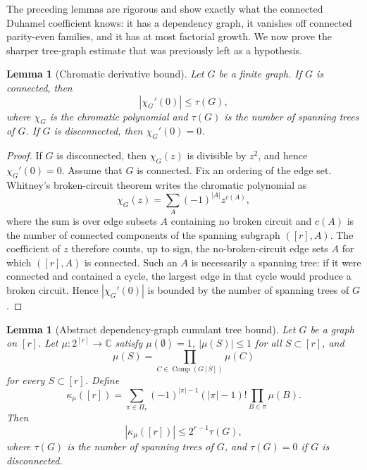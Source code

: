\documentclass[11pt]{article}
\newtheorem{lemma}[theorem]{Lemma}
\newcommand{\C}{\mathbb{C}}
\newcommand{\Comp}{\operatorname{Comp}}
\begin{document}
The preceding lemmas are rigorous and show exactly what the connected Duhamel
coefficient knows: it has a dependency graph, it vanishes off connected
parity-even families, and it has at most factorial growth.  We now prove the
sharper tree-graph estimate that was previously left as a hypothesis.

\begin{lemma}[Chromatic derivative bound]
  \label{lem:chromatic-derivative-bound}
  Let $G$ be a finite graph.  If $G$ is connected, then
  \begin{equation}\label{eq:chromatic-derivative-bound}
    |\chi_G'(0)|
    \leq
    \tau(G),
  \end{equation}
  where $\chi_G$ is the chromatic polynomial and $\tau(G)$ is the number of
  spanning trees of $G$.  If $G$ is disconnected, then $\chi_G'(0)=0$.
\end{lemma}

\begin{proof}
  If $G$ is disconnected, then $\chi_G(z)$ is divisible by $z^2$, and hence
  $\chi_G'(0)=0$.  Assume that $G$ is connected.  Fix an ordering of the edge
  set.  Whitney's broken-circuit theorem writes the chromatic polynomial as
  \begin{equation}\label{eq:whitney-broken-circuit}
    \chi_G(z)
    =
    \sum_{A}(-1)^{|A|}z^{c(A)},
  \end{equation}
  where the sum is over edge subsets $A$ containing no broken circuit and
  $c(A)$ is the number of connected components of the spanning subgraph
  $([r],A)$.  The coefficient of $z$ therefore counts, up to sign, the
  no-broken-circuit edge sets $A$ for which $([r],A)$ is connected.  Such an
  $A$ is necessarily a spanning tree: if it were connected and contained a
  cycle, the largest edge in that cycle would produce a broken circuit.  Hence
  $|\chi_G'(0)|$ is bounded by the number of spanning trees of $G$.
\end{proof}

\begin{lemma}[Abstract dependency-graph cumulant tree bound]
  \label{lem:abstract-dependency-tree-bound}
  Let $G$ be a graph on $[r]$.  Let $\mu:2^{[r]}\to\C$ satisfy
  $\mu(\emptyset)=1$, $|\mu(S)|\leq1$ for all $S\subset[r]$, and
  \begin{equation}\label{eq:abstract-factorization}
    \mu(S)
    =
    \prod_{C\in\Comp(G[S])}\mu(C)
  \end{equation}
  for every $S\subset[r]$.  Define
  \begin{equation}\label{eq:abstract-cumulant}
    \kappa_\mu([r])
    =
    \sum_{\pi\in\Pi_r}
    (-1)^{|\pi|-1}(|\pi|-1)!
    \prod_{B\in\pi}\mu(B).
  \end{equation}
  Then
  \begin{equation}\label{eq:abstract-tree-bound}
    |\kappa_\mu([r])|
    \leq
    2^{r-1}\tau(G),
  \end{equation}
  where $\tau(G)$ is the number of spanning trees of $G$, and $\tau(G)=0$ if
  $G$ is disconnected.
\end{lemma}
\end{document}
